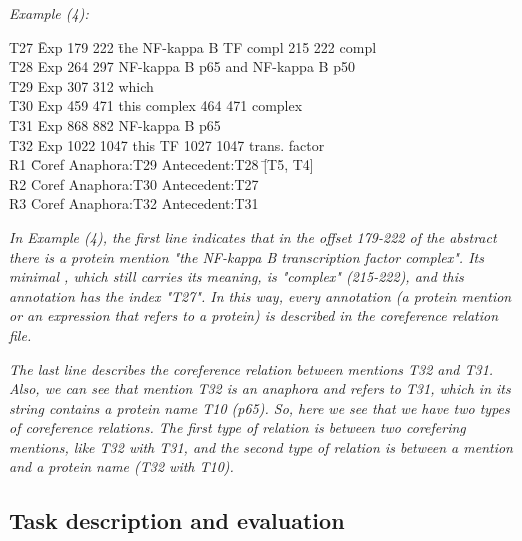 \emph{Example (4)\footnotemark :}
{\selectfont
	\begin{tabbing}
		{\small T27 \= Exp 179 222\hspace{3mm} \= the NF-kappa B TF compl 215 222 compl} \\
		{\small T28 \> Exp 264 297 \> NF-kappa B p65 and NF-kappa B p50}\\
		T29 \> Exp 307 312 \> which\\
		T30 \> Exp 459 471 \> this complex \hspace{2mm}   464 471 complex \\
		T31 \> Exp 868 882 \> NF-kappa B p65\\
		T32 \> Exp 1022 1047 \> this TF   1027 1047  trans. factor\\
		R1  \hspace{5mm} \=  Coref Anaphora:T29 Antecedent:T28  \hspace{5mm}  \= [T5, T4]\\
		R2 \>  Coref Anaphora:T30 Antecedent:T27\\
		R3 \>  Coref Anaphora:T32 Antecedent:T31  \>  [T10]\\
	\end{tabbing}
}
\vspace{5mm} 

\emph{In Example (4), the first line indicates that in the offset 179-222 of the abstract there is a protein mention "the NF-kappa B transcription factor complex". Its minimal , which still carries its meaning, is "complex" (215-222), and this annotation has the index "T27". In this way, every annotation (a protein mention or an expression that refers to a protein) is described in the coreference relation file.}

\emph{The last line describes the coreference relation between mentions T32 and T31. Also, we can see that mention T32 is an anaphora and refers to T31, which in its string contains a protein name T10 (p65). So, here we see that we have two types of coreference relations. The first type of relation is between two corefering mentions, like T32 with T31, and the second type of relation is between a mention and a protein name (T32 with T10).}

\subsection{Task description and evaluation}

